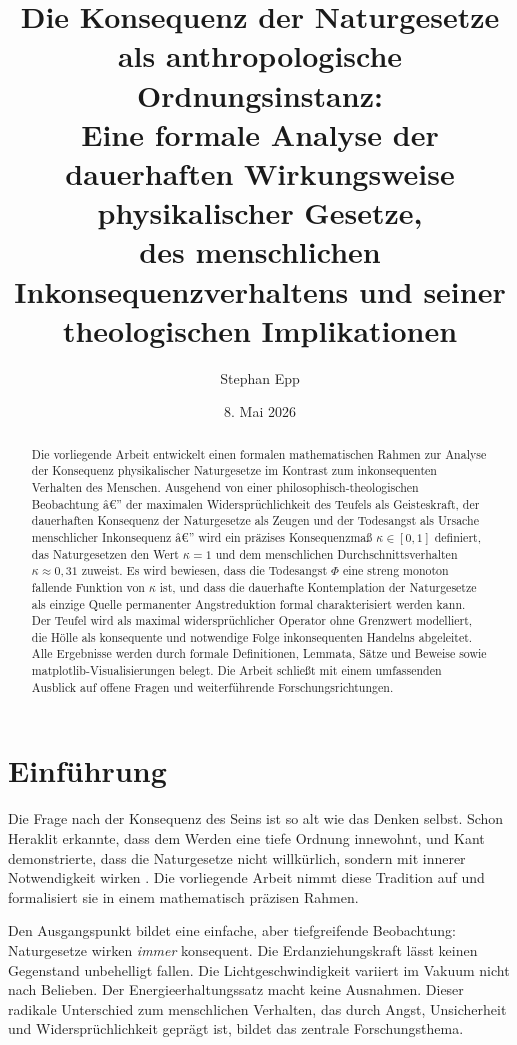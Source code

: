 ﻿\documentclass[a4paper,12pt]{article}
\title{Die Konsequenz der Naturgesetze als anthropologische Ordnungsinstanz:\\
\large Eine formale Analyse der dauerhaften Wirkungsweise physikalischer Gesetze,\\
des menschlichen Inkonsequenzverhaltens und seiner theologischen Implikationen}
\author{Stephan Epp}
\date{8. Mai 2026}
\theoremstyle{definition}
\begin{document}
\maketitle

\begin{abstract}
Die vorliegende Arbeit entwickelt einen formalen mathematischen Rahmen zur Analyse der Konsequenz physikalischer Naturgesetze im Kontrast zum inkonsequenten Verhalten des Menschen. Ausgehend von einer philosophisch-theologischen Beobachtung â€” der maximalen Widersprüchlichkeit des Teufels als Geisteskraft, der dauerhaften Konsequenz der Naturgesetze als Zeugen und der Todesangst als Ursache menschlicher Inkonsequenz â€” wird ein präzises Konsequenzmaß $\kappa \in [0,1]$ definiert, das Naturgesetzen den Wert $\kappa = 1$ und dem menschlichen Durchschnittsverhalten $\kappa \approx 0{,}31$ zuweist. Es wird bewiesen, dass die Todesangst $\Phi$ eine streng monoton fallende Funktion von $\kappa$ ist, und dass die dauerhafte Kontemplation der Naturgesetze als einzige Quelle permanenter Angstreduktion formal charakterisiert werden kann. Der Teufel wird als maximal widersprüchlicher Operator ohne Grenzwert modelliert, die Hölle als konsequente und notwendige Folge inkonsequenten Handelns abgeleitet. Alle Ergebnisse werden durch formale Definitionen, Lemmata, Sätze und Beweise sowie matplotlib-Visualisierungen belegt. Die Arbeit schließt mit einem umfassenden Ausblick auf offene Fragen und weiterführende Forschungsrichtungen.
\end{abstract}

\tableofcontents
\newpage

\section{Einführung}

Die Frage nach der Konsequenz des Seins ist so alt wie das Denken selbst. Schon Heraklit erkannte, dass dem Werden eine tiefe Ordnung innewohnt, und Kant demonstrierte, dass die Naturgesetze nicht willkürlich, sondern mit innerer Notwendigkeit wirken \cite{kant1781}. Die vorliegende Arbeit nimmt diese Tradition auf und formalisiert sie in einem mathematisch präzisen Rahmen.

Den Ausgangspunkt bildet eine einfache, aber tiefgreifende Beobachtung: Naturgesetze wirken \emph{immer} konsequent. Die Erdanziehungskraft lässt keinen Gegenstand unbehelligt fallen. Die Lichtgeschwindigkeit variiert im Vakuum nicht nach Belieben. Der Energieerhaltungssatz macht keine Ausnahmen. Dieser radikale Unterschied zum menschlichen Verhalten, das durch Angst, Unsicherheit und Widersprüchlichkeit geprägt ist, bildet das zentrale Forschungsthema.
\end{document}
